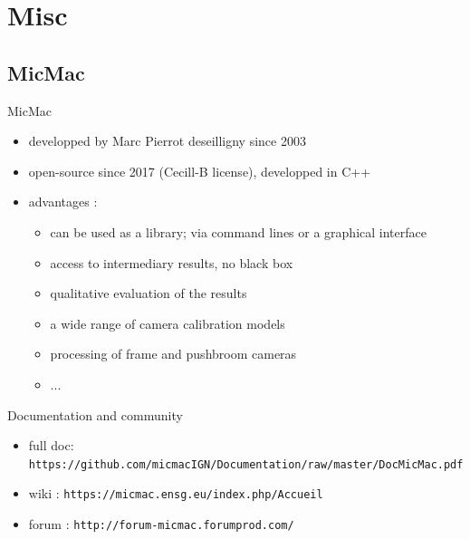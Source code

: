 \documentclass{beamer}
\begin{document}
	\section{Misc} 

		\subsection*{MicMac}
		\begin{frame}{MicMac}
			\begin{itemize}
			\item developped by Marc Pierrot deseilligny since 2003
			\item open-source since 2017 (Cecill-B license), developped in C++
			\item advantages :
				\begin{itemize}
				\item can be used as a library; via command lines or a graphical interface 
				\item access to intermediary results, no black box
				\item qualitative evaluation of the results
				\item a wide range of camera calibration models
				\item processing of frame and pushbroom cameras
				\item ...
		
				\end{itemize}
			\end{itemize}
		\end{frame}		 

		\begin{frame}{Documentation and community}
		\begin{itemize}
		\item \footnotesize full doc: \texttt{https://github.com/micmacIGN/Documentation/raw/master/DocMicMac.pdf}
		\item \footnotesize wiki : \texttt{https://micmac.ensg.eu/index.php/Accueil}
		\item \footnotesize forum : \texttt{http://forum-micmac.forumprod.com/}
		\end{itemize}
		\end{frame}
			
\end{document}
